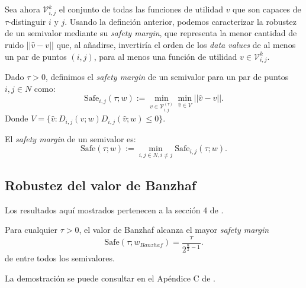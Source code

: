 Sea ahora $\mathcal{V}_{i,j}^{k}$ el conjunto de todas las funciones
de utilidad $v$ que son capaces de $\tau$-distinguir $i$ y $j$. 
Usando la definción anterior, podemos caracterizar la robustez de
un semivalor mediante su \textit{safety margin}, que representa la
menor cantidad de ruido $||\hat{v} - v||$ que, al añadirse,
invertiría el orden de los \textit{data values} de al menos un
par de puntos $(i,j)$, para al menos una función de utilidad $v \in
\mathcal{V}_{i,j}^{k}$.

\begin{definition}
  Dado $\tau > 0$, definimos el \emph{safety margin} 
  de un semivalor para un par de puntos $i,j \in N$ como:
  \begin{equation*}
    \text{Safe}_{i,j}(\tau;w):=\min_{v \in \mathcal{V}_{i,j}^{(\tau)}}
    \min_{\hat{v} \in V}
    ||\hat{v} - v||.
  \end{equation*}
  Donde $V = \{\hat{v}:D_{i,j}(v;w)D_{i,j}(\hat{v};w)\leq 0\}$.

  El \emph{safety margin} de un semivalor es: 
  \begin{equation*}
    \text{Safe}(\tau;w):=\min_{i,j \in N, i \neq j} \text{Safe}_{i,j}(\tau;w).
  \end{equation*}
\end{definition}



\subsection{Robustez del valor de Banzhaf}
Los resultados aquí mostrados pertenecen a la sección 4
de \cite{dataBanzhaf}.

\begin{theorem}
  Para cualquier $\tau > 0$, el valor de Banzhaf
  alcanza el mayor \textit{safety margin}
  \[
  \text{Safe}(\tau;w_{Banzhaf})=\frac{\tau}{2^{\frac{n}{2}-1}}.  
  \]
  de entre todos los semivalores.
\end{theorem}

La demostración se puede consultar en el Apéndice
C de \cite{dataBanzhaf}.

\

